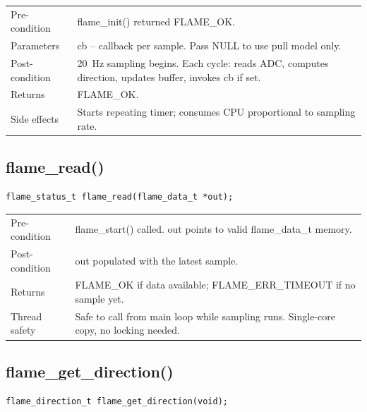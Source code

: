 \documentclass[12pt]{article}
\newcommand{\fn}[1]{{\footnotesize\ttfamily #1}}
\begin{document}
\begin{table}[H]\centering\small
\begin{tabularx}{\textwidth}{L{3cm} X}
\toprule
Pre-condition  & \fn{flame\_init()} returned \fn{FLAME\_OK}. \\
Parameters     & \fn{cb} -- callback per sample. Pass \fn{NULL} to use pull model only. \\
Post-condition & 20~Hz sampling begins. Each cycle: reads ADC, computes direction, updates buffer, invokes \fn{cb} if set. \\
Returns        & \fn{FLAME\_OK}. \\
Side effects   & Starts repeating timer; consumes CPU proportional to sampling rate. \\
\bottomrule
\end{tabularx}
\end{table}

\subsection{\fn{flame\_read()}}

\begin{lstlisting}[caption={Signature}]
flame_status_t flame_read(flame_data_t *out);
\end{lstlisting}

\begin{table}[H]\centering\small
\begin{tabularx}{\textwidth}{L{3cm} X}
\toprule
Pre-condition  & \fn{flame\_start()} called. \fn{out} points to valid \fn{flame\_data\_t} memory. \\
Post-condition & \fn{*out} populated with the latest sample. \\
Returns        & \fn{FLAME\_OK} if data available; \fn{FLAME\_ERR\_TIMEOUT} if no sample yet. \\
Thread safety  & Safe to call from main loop while sampling runs. Single-core copy, no locking needed. \\
\bottomrule
\end{tabularx}
\end{table}

\subsection{\fn{flame\_get\_direction()}}

\begin{lstlisting}[caption={Signature}]
flame_direction_t flame_get_direction(void);
\end{lstlisting}
\end{document}
